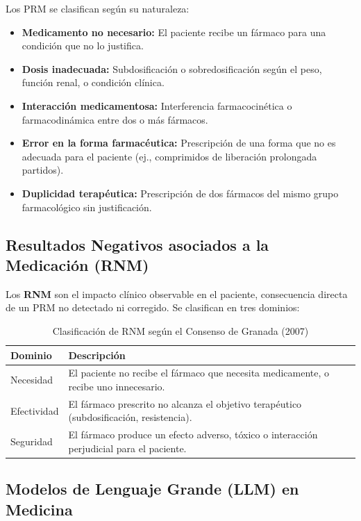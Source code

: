 \documentclass[12pt,a4paper]{article}
\begin{document}
Los PRM se clasifican según su naturaleza:
\begin{itemize}
  \item \textbf{Medicamento no necesario:} El paciente recibe un fármaco para una condición que no
    lo justifica.
  \item \textbf{Dosis inadecuada:} Subdosificación o sobredosificación según el peso, función
    renal, o condición clínica.
  \item \textbf{Interacción medicamentosa:} Interferencia farmacocinética o farmacodinámica entre
    dos o más fármacos.
  \item \textbf{Error en la forma farmacéutica:} Prescripción de una forma que no es adecuada para
    el paciente (ej., comprimidos de liberación prolongada partidos).
  \item \textbf{Duplicidad terapéutica:} Prescripción de dos fármacos del mismo grupo
    farmacológico sin justificación.
\end{itemize}

\subsection{Resultados Negativos asociados a la Medicación (RNM)}

Los \textbf{RNM} son el impacto clínico observable en el paciente, consecuencia directa de un PRM
no detectado ni corregido. Se clasifican en tres dominios:

\begin{table}[H]
  \centering
  \caption{Clasificación de RNM según el Consenso de Granada (2007)}
  \begin{tabularx}{\textwidth}{lX}
    \toprule
    \textbf{Dominio} & \textbf{Descripción} \\
    \midrule
    Necesidad & El paciente no recibe el fármaco que necesita medicamente, o recibe uno innecesario. \\
    \midrule
    Efectividad & El fármaco prescrito no alcanza el objetivo terapéutico (subdosificación, resistencia). \\
    \midrule
    Seguridad & El fármaco produce un efecto adverso, tóxico o interacción perjudicial para el paciente. \\
    \bottomrule
  \end{tabularx}
\end{table}

\subsection{Modelos de Lenguaje Grande (LLM) en Medicina}
\end{document}
